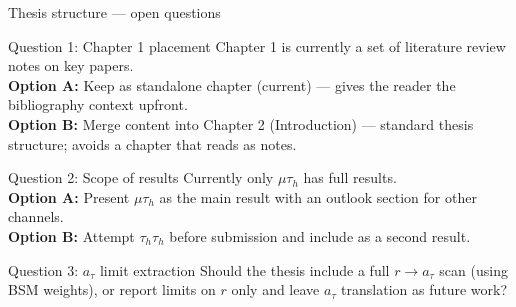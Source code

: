 \begin{frame}{Thesis structure --- open questions}
\protect{}\label{thesis-structure-open-questions}
\begin{block}{Question 1: Chapter 1 placement}
\protect{}\label{question-1-chapter-1-placement}
Chapter 1 is currently a set of literature review notes on key papers.\\
\textbf{Option A:} Keep as standalone chapter (current) --- gives the
reader the bibliography context upfront.\\
\textbf{Option B:} Merge content into Chapter 2 (Introduction) ---
standard thesis structure; avoids a chapter that reads as notes.
\end{block}

\begin{block}{Question 2: Scope of results}
\protect{}\label{question-2-scope-of-results}
Currently only \(\mu\tau_h\) has full results.\\
\textbf{Option A:} Present \(\mu\tau_h\) as the main result with an
outlook section for other channels.\\
\textbf{Option B:} Attempt \(\tau_h\tau_h\) before submission and
include as a second result.
\end{block}

\begin{block}{Question 3: \(a_\tau\) limit extraction}
\protect{}\label{question-3-a_tau-limit-extraction}
Should the thesis include a full \(r \to a_\tau\) scan (using BSM
weights), or report limits on \(r\) only and leave \(a_\tau\)
translation as future work?
\end{block}
\end{frame}

